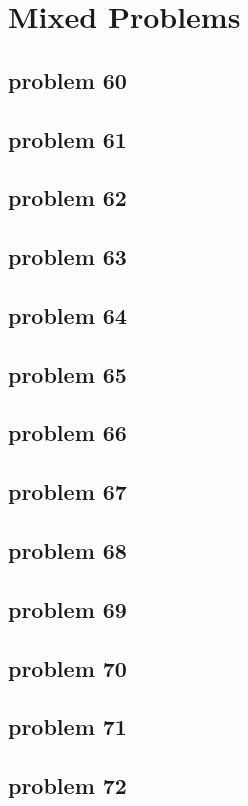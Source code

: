 \section{Mixed Problems}

\subsection{problem 60}


\subsection{problem 61}


\subsection{problem 62}


\subsection{problem 63}


\subsection{problem 64}


\subsection{problem 65}


\subsection{problem 66}


\subsection{problem 67}


\subsection{problem 68}


\subsection{problem 69}


\subsection{problem 70}


\subsection{problem 71}


\subsection{problem 72}

